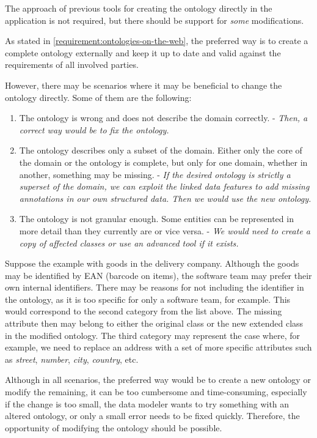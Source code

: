 \begin{requirement}
  \label{requirement:pim-editing}
  The approach of previous tools for creating the ontology directly in the application is not required, but there should be support for \textit{some} modifications.
\end{requirement}

As stated in \autoref{requirement:ontologies-on-the-web}, the preferred way is to create a complete ontology externally and keep it up to date and valid against the requirements of all involved parties.

However, there may be scenarios where it may be beneficial to change the ontology directly. Some of them are the following:

\begin{enumerate}
  \item The ontology is wrong and does not describe the domain correctly. - \textit{Then, a correct way would be to fix the ontology.}
  \item The ontology describes only a subset of the domain. Either only the core of the domain or the ontology is complete, but only for one domain, whether in another, something may be missing. - \textit{If the desired ontology is strictly a superset of the domain, we can exploit the linked data features to add missing annotations in our own structured data. Then we would use the new ontology.}
  \item The ontology is not granular enough. Some entities can be represented in more detail than they currently are or vice versa. - \textit{We would need to create a copy of affected classes or use an advanced tool if it exists.}
\end{enumerate}

Suppose the example with goods in the delivery company. Although the goods may be identified by EAN (barcode on items), the software team may prefer their own internal identifiers. There may be reasons for not including the identifier in the ontology, as it is too specific for only a software team, for example. This would correspond to the second category from the list above. The missing attribute then may belong to either the original class or the new extended class in the modified ontology. The third category may represent the case where, for example, we need to replace an address with a set of more specific attributes such as \textit{street}, \textit{number}, \textit{city}, \textit{country}, etc.

Although in all scenarios, the preferred way would be to create a new ontology or modify the remaining, it can be too cumbersome and time-consuming, especially if the change is too small, the data modeler wants to try something with an altered ontology, or only a small error needs to be fixed quickly. Therefore, the opportunity of modifying the ontology should be possible.

